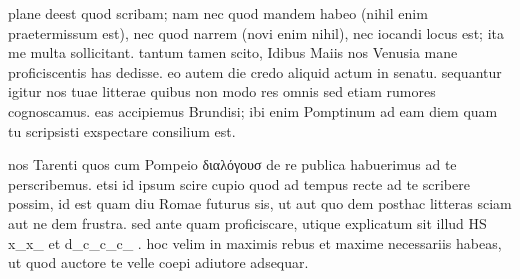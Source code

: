 


 plane deest quod scribam; nam nec quod mandem habeo (nihil enim praetermissum est), nec quod narrem (novi enim nihil), nec iocandi locus est; ita me multa sollicitant. tantum tamen scito, Idibus Maiis nos Venusia mane proficiscentis has dedisse. eo autem die credo aliquid actum in senatu. sequantur igitur nos tuae litterae quibus non modo res omnis sed etiam rumores cognoscamus. eas accipiemus Brundisi; ibi enim Pomptinum ad eam diem quam tu scripsisti exspectare consilium est.

 nos Tarenti quos cum Pompeio διαλόγουσ de re publica habuerimus ad te perscribemus. etsi id ipsum scire cupio quod ad tempus recte ad te scribere possim, id est quam diu Romae futurus sis, ut aut quo dem posthac litteras sciam aut ne dem frustra. sed ante quam proficiscare, utique explicatum sit illud HS x_x_ et d_c_c_c_ . hoc velim in maximis rebus et maxime necessariis habeas, ut quod auctore te velle coepi adiutore adsequar.
